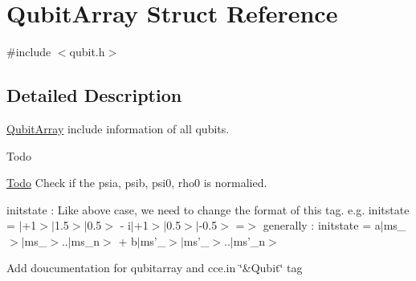\hypertarget{structQubitArray}{\section{Qubit\-Array Struct Reference}
\label{structQubitArray}
}


{\ttfamily \#include $<$qubit.\-h$>$}



\subsection{Detailed Description}
\hyperlink{structQubitArray}{Qubit\-Array} include information of all qubits. 

\begin{DoxyRefDesc}{Todo}
\item[\hyperlink{todo__todo000015}{Todo}]Check if the psia, psib, psi0, rho0 is normalied. 

initstate \-: Like above case, we need to change the format of this tag. e.\-g. initstate = $|$+1$>$$|$1.5$>$$|$0.5$>$ -\/ i$|$+1$>$$|$0.5$>$$|$-\/0.5$>$ =$>$ generally \-: initstate = a$|$ms\-\_$>$$|$ms\-\_$>$..$|$ms\-\_\-n$>$ + b$|$ms'\-\_$>$$|$ms'\-\_$>$..$|$ms'\-\_\-n$>$ 

Add doucumentation for qubitarray and cce.\-in \char`\"{}\&\-Qubit\char`\"{} tag \end{DoxyRefDesc}


